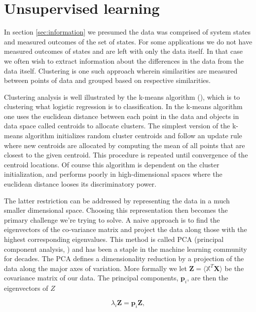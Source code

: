 \section{Unsupervised learning}

In section \ref{sec:information} we presumed the data was comprised of system states and measured outcomes of the set of states. For some applications we do not have measured outcomes of states and are left with only the data itself. In that case we often wish to extract information about the differences in the data from the data itself. Clustering is one such approach wherein similarities are measured between points of data and grouped based on respective similarities.

Clustering analysis is well illustrated by the k-means algorithm (\cite{Neyman1967}), which is to clustering what logistic regression is to classification.  In the k-means algorithm one uses the euclidean distance between each point in the data and objects in data space called centroids to allocate clusters. The simplest version of the k-means algorithm initializes random cluster centroids and follow an update rule where new centroids are allocated by computing the mean of all points that are closest to the given centroid. This procedure is repeated until convergence of the centroid locations. Of course this algorithm is dependent on the cluster initialization, and performs poorly in high-dimensional spaces where the euclidean distance looses its discriminatory power. 

The latter restriction can be addressed by representing the data in a much smaller dimensional space. Choosing this representation then becomes the primary challenge we're trying to solve. A naive approach is to find the eigenvectors of the co-variance matrix and project the data along those with the highest corresponding eigenvalues. This method is called PCA (principal component analysis, \cite{Marsland2009}) and has been a staple in the machine learning community for decades. The PCA defines a dimensionality reduction by a projection of the data along the major axes of variation. More formally we let $\mathbf{Z} = \langle \mathbb{X}^T\mathbf{X}\rangle$ be the covariance matrix of our data. The principal components, $\mathbf{p}_i$, are then the eigenvectors of $Z$ 

\begin{equation}\label{eq:pca}
\lambda_i \mathbf{Z} = \mathbf{p}_i \mathbf{Z},
\end{equation}

